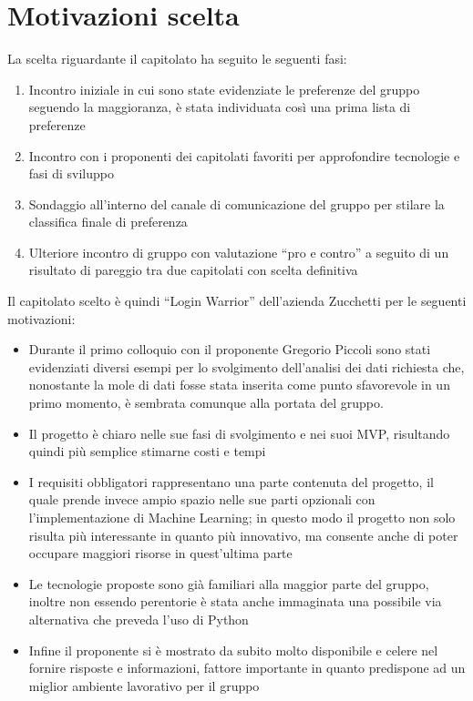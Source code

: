 \section{Motivazioni scelta}
La scelta riguardante il capitolato ha seguito le seguenti fasi:
\begin{enumerate}
	\item Incontro iniziale in cui sono state evidenziate le preferenze del gruppo seguendo la maggioranza, è stata individuata così una prima lista di preferenze
	\item Incontro con i proponenti dei capitolati favoriti per approfondire tecnologie e fasi di sviluppo
	\item Sondaggio all'interno del canale di comunicazione del gruppo per stilare la classifica finale di preferenza
	\item Ulteriore incontro di gruppo con valutazione ``pro e contro'' a seguito di un risultato di pareggio tra due capitolati con scelta definitiva
\end{enumerate}
Il capitolato scelto è quindi ``Login Warrior'' dell'azienda Zucchetti per le seguenti motivazioni:
\begin{itemize}
	\item Durante il primo colloquio con il proponente Gregorio Piccoli sono stati evidenziati diversi esempi per lo svolgimento dell'analisi dei dati richiesta che, nonostante la mole di dati fosse stata inserita come punto sfavorevole in un primo momento, è sembrata comunque alla portata del gruppo.
	\item Il progetto è chiaro nelle sue fasi di svolgimento e nei suoi MVP, risultando quindi più semplice stimarne costi e tempi
	\item I requisiti obbligatori rappresentano una parte contenuta del progetto, il quale prende invece ampio spazio nelle sue parti opzionali con l'implementazione di Machine Learning; in questo modo il progetto non solo risulta più interessante in quanto più innovativo, ma consente anche di poter occupare maggiori risorse in quest'ultima parte
	\item Le tecnologie proposte sono già familiari alla maggior parte del gruppo, inoltre non essendo perentorie è stata anche immaginata una possibile via alternativa che preveda l'uso di Python
	\item Infine il proponente si è mostrato da subito molto disponibile e celere nel fornire risposte e informazioni, fattore importante in quanto predispone ad un miglior ambiente lavorativo per il gruppo
\end{itemize}